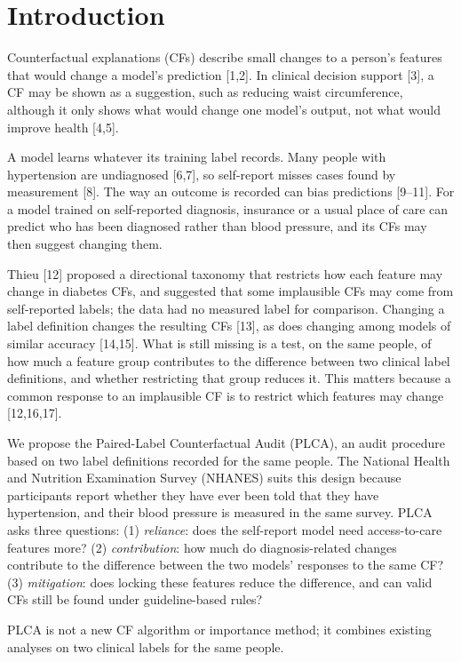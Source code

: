 \documentclass[preprint,review,12pt,times]{elsarticle}
\begin{document}
\section{Introduction}

Counterfactual explanations (CFs) describe small changes to a person's
features that would change a model's prediction {[}1,2{]}. In clinical
decision support {[}3{]}, a CF may be shown as a suggestion, such as
reducing waist circumference, although it only shows what would change
one model's output, not what would improve health {[}4,5{]}.

A model learns whatever its training label records. Many people with
hypertension are undiagnosed {[}6,7{]}, so self-report misses cases
found by measurement {[}8{]}. The way an outcome is recorded can bias
predictions {[}9--11{]}. For a model trained on self-reported diagnosis,
insurance or a usual place of care can predict who has been diagnosed
rather than blood pressure, and its CFs may then suggest changing them.

Thieu {[}12{]} proposed a directional taxonomy that restricts how each
feature may change in diabetes CFs, and suggested that some implausible
CFs may come from self-reported labels; the data had no measured label
for comparison. Changing a label definition changes the resulting CFs
{[}13{]}, as does changing among models of similar accuracy {[}14,15{]}.
What is still missing is a test, on the same people, of how much a
feature group contributes to the difference between two clinical label
definitions, and whether restricting that group reduces it. This matters
because a common response to an implausible CF is to restrict which
features may change {[}12,16,17{]}.

We propose the Paired-Label Counterfactual Audit (PLCA), an audit
procedure based on two label definitions recorded for the same people.
The National Health and Nutrition Examination Survey (NHANES) suits this
design because participants report whether they have ever been told that
they have hypertension, and their blood pressure is measured in the same
survey. PLCA asks three questions: (1) \emph{reliance}: does the
self-report model need access-to-care features more? (2)
\emph{contribution}: how much do diagnosis-related changes contribute to
the difference between the two models' responses to the same CF? (3)
\emph{mitigation}: does locking these features reduce the difference,
and can valid CFs still be found under guideline-based rules?

PLCA is not a new CF algorithm or importance method; it combines
existing analyses on two clinical labels for the same people.
\end{document}

